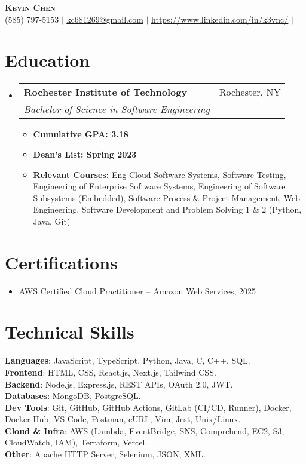 \documentclass[letterpaper,11pt]{article}
\makeatletter
\newcommand{\resumeItem}[1]{
  \item\small{
    {#1 \vspace{-2pt}}
  }
}
\newcommand{\resumeSubheading}[4]{
  \vspace{-2pt}\item
    \begin{tabular*}{0.97\textwidth}[t]{l@{\extracolsep{\fill}}r}
      \textbf{#1} & #2 \\
      \textit{\small#3} & \textit{\small #4} \\
    \end{tabular*}\vspace{-7pt}
}
\newcommand{\resumeSubHeadingListStart}{\begin{itemize}[leftmargin=0.15in, label={}]}
\newcommand{\resumeSubHeadingListEnd}{\end{itemize}}
\newcommand{\resumeItemListStart}{\begin{itemize}}
\newcommand{\resumeItemListEnd}{\end{itemize}\vspace{-5pt}}
\makeatother
\begin{document}
\begin{center}
    \textbf{\Huge \scshape Kevin Chen} \\ \vspace{1pt}
    \small (585) 797-5153 $|$ \href{mailto:x@x.com}{\underline{kc681269@gmail.com}} $|$ 
    \href{https://linkedin.com/in/...}{\underline{https://www.linkedin.com/in/k3vnc/}} $|$
\end{center}

\section{Education}
  \resumeSubHeadingListStart
    \resumeSubheading
      {Rochester Institute of Technology}{Rochester, NY}
      {Bachelor of Science in Software Engineering}{}
      \resumeItemListStart
        \resumeItem{\textbf{Cumulative GPA: 3.18}}
        \resumeItem{\textbf{Dean's List: Spring 2023}}
        \resumeItem{\textbf{Relevant Courses:} Eng Cloud Software Systems, Software Testing, Engineering of Enterprise Software Systems, Engineering of Software Subsystems (Embedded), Software Process \& Project Management, Web Engineering, Software Development and Problem Solving 1 \& 2 (Python, Java, Git)}
      \resumeItemListEnd
  \resumeSubHeadingListEnd

\section{Certifications}
  \resumeSubHeadingListStart
    \resumeItem{AWS Certified Cloud Practitioner -- Amazon Web Services, 2025}
  \resumeSubHeadingListEnd

\section{Technical Skills}
\begin{itemize}[leftmargin=0.15in, label={}]
\small{\item{
\textbf{Languages}{: JavaScript, TypeScript, Python, Java, C, C++, SQL.} \\
\textbf{Frontend}{: HTML, CSS, React.js, Next.js, Tailwind CSS.} \\
\textbf{Backend}{: Node.js, Express.js, REST APIs, OAuth 2.0, JWT.} \\
\textbf{Databases}{: MongoDB, PostgreSQL.} \\
\textbf{Dev Tools}{: Git, GitHub, GitHub Actions, GitLab (CI/CD, Runner), Docker, Docker Hub, VS Code, Postman, cURL, Vim, Jest, Unix/Linux.} \\
\textbf{Cloud \& Infra}{: AWS (Lambda, EventBridge, SNS, Comprehend, EC2, S3, CloudWatch, IAM), Terraform, Vercel.} \\
\textbf{Other}{: Apache HTTP Server, Selenium, JSON, XML.}}}
\end{itemize}
\end{document}
